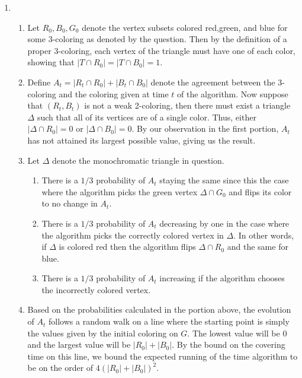\documentclass[12pt]{article}%
\begin{document}
\begin{enumerate}
  \item
  \begin{enumerate}
    \item Let $R_0,B_0,G_0$ denote the vertex subsets colored red,green, and blue for some 3-coloring as denoted by the question. Then by the definition of a proper 3-coloring, each vertex of the triangle must have one of each color, showing that $|T \cap R_0| = |T \cap B_0| = 1$.
    \item Define $A_t = |R_t \cap R_0| + |B_t \cap B_0|$ denote the agreement between the 3-coloring and the coloring given at time $t$ of the algorithm. Now suppose that $(R_t,B_t)$ is not a weak 2-coloring, then there must exist a triangle $\Delta$ such that all of its vertices are of a single color. Thus, either $|\Delta \cap R_0| = 0$ or $|\Delta \cap B_0| = 0$. By our observation in the first portion, $A_t$ has not attained its largest possible value, giving us the result.
    \item Let $\Delta$ denote the monochromatic triangle in question.
    \begin{enumerate}
      \item There is a $1/3$ probability of $A_t$ staying the same since this the case where the algorithm picks the green vertex $\Delta \cap G_0$ and flips its color to no change in $A_t$.
      \item There is a $1/3$ probability of $A_t$ decreasing by one in the case where the algorithm picks the correctly colored vertex in $\Delta$. In other words, if $\Delta$ is colored red then the algorithm flips $\Delta \cap R_0$ and the same for blue.
      \item There is a $1/3$ probability of $A_t$ increasing if the algorithm chooses the incorrectly colored vertex.
    \end{enumerate}
    \item Based on the probabilities calculated in the portion above, the evolution of $A_t$ follows a random walk on a line where the starting point is simply the values given by the initial coloring on $G$. The lowest value will be $0$ and the largest value will be $|R_0| + |B_0|$. By the bound on the covering time on this line, we bound the expected running of the time algorithm to be on the order of $4(|R_0|+|B_0|)^2$.
  \end{enumerate}
\end{enumerate}

\newpage
\end{document}

